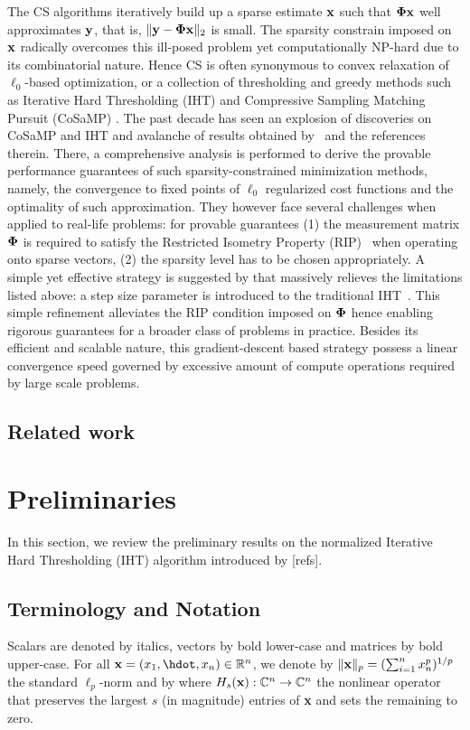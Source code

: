 \documentclass{article}
\begin{document}
The CS algorithms iteratively build up a sparse estimate ${\bf x}$ such that ${\bf \Phi}  {\bf x}$ well approximates ${\bf y}$, that is,  $\| {\bf y}- {\bf \Phi}  {\bf x} \|_2$ is small. The sparsity constrain imposed on ${\bf x}$ radically overcomes this ill-posed problem yet computationally NP-hard due to its combinatorial nature. Hence CS is often synonymous to convex relaxation of $\ell_0$-based optimization, or a collection of thresholding and greedy methods such as Iterative Hard Thresholding (IHT) \cite{blumensath2008iht, blumensath2009iht} and Compressive Sampling Matching Pursuit (CoSaMP) \cite{needel2008cosamp}. The past decade has seen an explosion of discoveries on CoSaMP and IHT and avalanche of results obtained by~\cite{liu2017dualiht, yuan2014ht, yuan2016htp, blumensath2013cs, needel2008cosamp} and the references therein. There, a comprehensive analysis is performed to derive the provable performance guarantees of such sparsity-constrained minimization methods, namely, the convergence to fixed points of $\ell_0$ regularized cost functions and the optimality of such approximation. They however face several challenges when applied to real-life problems: for provable guarantees (1) the measurement matrix ${\bf \Phi}$ is required to satisfy the Restricted Isometry Property (RIP)~\cite{candes2008rip, chartrand2008rip} when operating onto sparse vectors, (2) the sparsity level has to be chosen appropriately. A simple yet effective strategy is suggested by \cite{blumensath2010niht} that massively relieves the limitations listed above: a step size parameter is introduced to the traditional IHT~\cite{blumensath2008iht}. This simple refinement alleviates the RIP condition imposed on ${\bf \Phi}$ hence enabling rigorous guarantees for a broader class of problems in practice. Besides its efficient and scalable nature, this gradient-descent based strategy possess a linear convergence speed governed by excessive amount of compute operations required by large scale problems. 
\subsection{Related work}


\section{Preliminaries}
In this section, we review the preliminary results on the normalized Iterative Hard Thresholding (IHT) algorithm introduced by [refs].
\subsection{Terminology and Notation}
Scalars are denoted by italics, vectors by bold lower-case and matrices by bold upper-case. For all ${\bf x}= (x_1, \hdot, x_n) \in \mathbb{R}^n$, we denote by $\|{\bf x}\|_p = (\sum_{i=1}^n x_n^p)^{1/p}$ the standard ${\ell}_p$-norm and by
where $H_s({\bf x}): \mathbb{C}^n \rightarrow \mathbb{C}^n$ the nonlinear operator that preserves the largest $s$ (in magnitude) entries of {\bf x} and sets the remaining to zero. 
\end{document}
